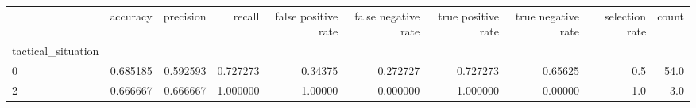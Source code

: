 \begin{tabular}{lrrrrrrrrr}
\toprule
{} &  accuracy &  precision &    recall &  false positive rate &  false negative rate &  true positive rate &  true negative rate &  selection rate &  count \\
tactical\_situation &           &            &           &                      &                      &                     &                     &                 &        \\
\midrule
0                  &  0.685185 &   0.592593 &  0.727273 &              0.34375 &             0.272727 &            0.727273 &             0.65625 &             0.5 &   54.0 \\
2                  &  0.666667 &   0.666667 &  1.000000 &              1.00000 &             0.000000 &            1.000000 &             0.00000 &             1.0 &    3.0 \\
\bottomrule
\end{tabular}
